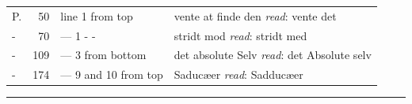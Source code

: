 \documentclass[12pt]{book}
\begin{document}
\noindent
\begin{tabular}{@{}l r l l@{}}
P. & 50  & line 1 from top & vente at finde den \emph{read}: vente det\\
-  & 70  & --- 1 - -      & stridt mod \emph{read}: stridt med\\
-  & 109 & --- 3 from bottom   & det absolute Selv \emph{read}: det Absolute selv\\
-  & 174 & --- 9 and 10 from top & Saducæer \emph{read}: Sadducæer\\
\end{tabular}

\begin{center}\rule{3cm}{0.4pt}\end{center}
\end{document}
